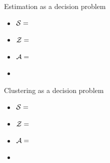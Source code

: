 \documentclass[10pt]{beamer}
\begin{document}
\begin{frame}{Estimation as a decision problem}
  \begin{itemize}
  \item $\mathcal{S} = $
  \item $\mathcal{Z} = $
  \item $\mathcal{A} = $
  \item
  \end{itemize}
  \blank
\end{frame}

\begin{frame}{Clustering as a decision problem}
  \begin{itemize}
    \item $\mathcal{S} = $
    \item $\mathcal{Z} = $
    \item $\mathcal{A} = $
    \item
    \end{itemize}
    \blank
  \end{frame}

\end{document}
